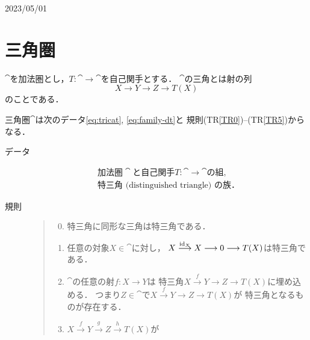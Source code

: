 
\newpage
{\Large{2023/05/01}}
\section{三角圏}\label{ssec:tricat}
$\cat$を加法圏とし，$T\colon\cat\to\cat$を自己関手とする．
$\cat$の三角とは射の列
\begin{equation*}
    X\to Y\to Z\to T(X)
\end{equation*}
のことである．

\begin{Definition}
    三角圏$\cat$は次のデータ\eqref{eq:tricat}, \eqref{eq:family-dt}と
    規則(TR\ref{TR0})--(TR\ref{TR5})からなる．
    \begin{description}%
        \item[データ] \begin{align}
            \text{加法圏}\cat\text{と自己関手}T\colon\cat\to\cat\text{の組},\label{eq:tricat}\\
            \text{特三角 (distinguished triangle) の族．}\label{eq:family-dt}
        \end{align}    
        \item[規則] \label{des:data}
        \begin{quote}
            \begin{enumerate}
                \setcounter{enumi}{-1}
                \renewcommand{\labelenumi}{(TR{\arabic{enumi}})}
                \item 特三角に同形な三角は特三角である．\label{TR0}
                \item 任意の対象$X\in\cat$に対し，
                    $X\overset{\mathop{\mathrm{id}}\nolimits_X}{\longrightarrow}X\longrightarrow
                    0\longrightarrow T(X)$は特三角である．\label{TR1}
                \item $\cat$の任意の射$f\colon X\to Y$は
                    特三角$X\overset{f}{\to}Y\to Z\to T(X)$に埋め込める．
                    つまり$Z\in\cat$で$X\overset{f}{\to}Y\to Z\to T(X)$が
                    特三角となるものが存在する．\label{TR2}
                \item $X\overset{f}{\to}
                    Y\overset{g}{\to} 
                    Z\overset{h}{\to} T(X)$が

\end{enumerate}
\end{quote}
\end{description}
\end{Definition}
